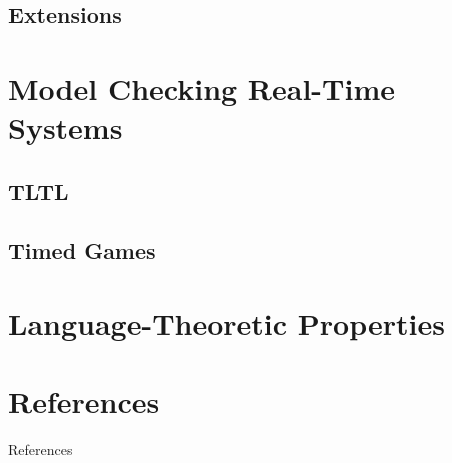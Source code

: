 \documentclass{beamer}
\theoremstyle{definition}
\begin{document}
\subsection{Extensions}

\section{Model Checking Real-Time Systems}
\subsection{TLTL}
\subsection{Timed Games}

\section{Language-Theoretic Properties}

\section{References}
\begin{frame}{References}
  
  
\end{frame}
\end{document}
